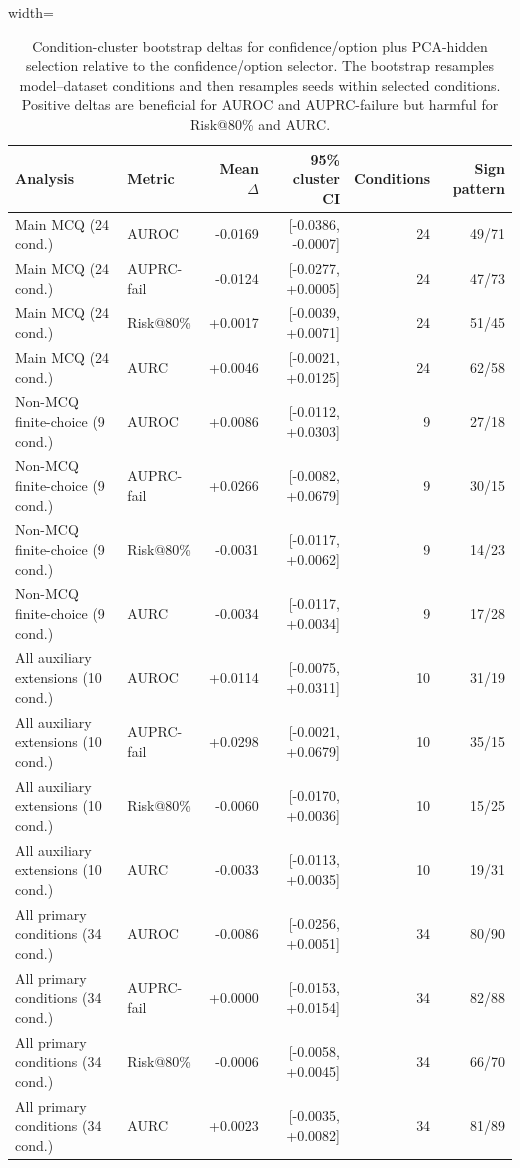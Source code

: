 
\begin{table}[t]
\centering
\small
\caption{Condition-cluster bootstrap deltas for confidence/option plus PCA-hidden selection relative to the confidence/option selector. The bootstrap resamples model--dataset conditions and then resamples seeds within selected conditions. Positive deltas are beneficial for AUROC and AUPRC-failure but harmful for Risk@80\% and AURC.}
\label{tab:condition-cluster-bootstrap}
\begin{adjustbox}{width=\textwidth}
\begin{tabular}{llrrrr}
\toprule
Analysis & Metric & Mean $\Delta$ & 95\% cluster CI & Conditions & Sign pattern \\
\midrule
Main MCQ (24 cond.) & AUROC & -0.0169 & [-0.0386, -0.0007] & 24 & 49/71 \\
Main MCQ (24 cond.) & AUPRC-fail & -0.0124 & [-0.0277, +0.0005] & 24 & 47/73 \\
Main MCQ (24 cond.) & Risk@80\% & +0.0017 & [-0.0039, +0.0071] & 24 & 51/45 \\
Main MCQ (24 cond.) & AURC & +0.0046 & [-0.0021, +0.0125] & 24 & 62/58 \\
Non-MCQ finite-choice (9 cond.) & AUROC & +0.0086 & [-0.0112, +0.0303] & 9 & 27/18 \\
Non-MCQ finite-choice (9 cond.) & AUPRC-fail & +0.0266 & [-0.0082, +0.0679] & 9 & 30/15 \\
Non-MCQ finite-choice (9 cond.) & Risk@80\% & -0.0031 & [-0.0117, +0.0062] & 9 & 14/23 \\
Non-MCQ finite-choice (9 cond.) & AURC & -0.0034 & [-0.0117, +0.0034] & 9 & 17/28 \\
All auxiliary extensions (10 cond.) & AUROC & +0.0114 & [-0.0075, +0.0311] & 10 & 31/19 \\
All auxiliary extensions (10 cond.) & AUPRC-fail & +0.0298 & [-0.0021, +0.0679] & 10 & 35/15 \\
All auxiliary extensions (10 cond.) & Risk@80\% & -0.0060 & [-0.0170, +0.0036] & 10 & 15/25 \\
All auxiliary extensions (10 cond.) & AURC & -0.0033 & [-0.0113, +0.0035] & 10 & 19/31 \\
All primary conditions (34 cond.) & AUROC & -0.0086 & [-0.0256, +0.0051] & 34 & 80/90 \\
All primary conditions (34 cond.) & AUPRC-fail & +0.0000 & [-0.0153, +0.0154] & 34 & 82/88 \\
All primary conditions (34 cond.) & Risk@80\% & -0.0006 & [-0.0058, +0.0045] & 34 & 66/70 \\
All primary conditions (34 cond.) & AURC & +0.0023 & [-0.0035, +0.0082] & 34 & 81/89 \\
\bottomrule
\end{tabular}
\end{adjustbox}
\end{table}
